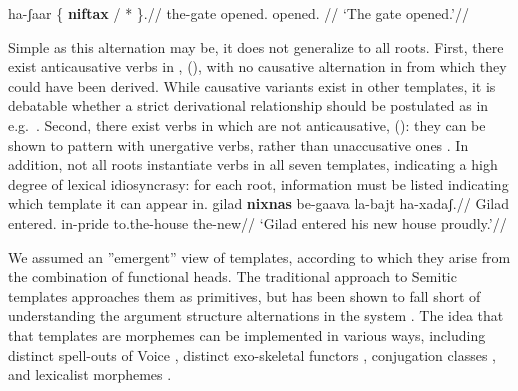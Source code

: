 	\a \begingl
		\gla ha-ʃaar \{ \textbf{niftax} / * \}.//
		\glb the-gate {} opened. {} \phantom{*}opened. {}//
		\glft `The gate opened.'//
		\endgl
\xe

Simple as this alternation may be, it does not generalize to all roots. First, there exist anticausative verbs in {\tnif}, (\nextx), with no causative alternation in {\tkal} from which they could have been derived. While causative variants exist in other templates, it is debatable whether a strict derivational relationship should be postulated as in e.g.~\cite{laks13morpho}. Second, there exist verbs in {\tnif} which are not anticausative, (\anextx): they can be shown to pattern with unergative verbs, rather than unaccusative ones \citep{kastner16phd}. In addition, not all roots instantiate verbs in all seven templates, indicating a high degree of lexical idiosyncrasy: for each root, information must be listed indicating which template it can appear in.
\ex{}
\xe
\ex
	\begingl
		\gla gilad \textbf{nixnas} be-gaava la-bajt ha-xadaʃ.//
		\glb Gilad entered. in-pride to.the-house the-new//
		\glft `Gilad entered his new house proudly.'//
		\endgl
\xe



We assumed an ''emergent'' view of templates, according to which they arise from the combination of functional heads. The traditional approach to Semitic templates approaches them as primitives, but has been shown to fall short of understanding the argument structure alternations in the system \citep{doron03,kastner16phd,kastner17gjgl,kastner18}. The idea that that templates are morphemes can be implemented in various ways, including distinct spell-outs of Voice \citep{arad05}, distinct exo-skeletal functors \citep{borer13oup}, conjugation classes \citep{aronoff07}, and lexicalist morphemes \citep{reinhartsiloni05,laks11,laks14}.

